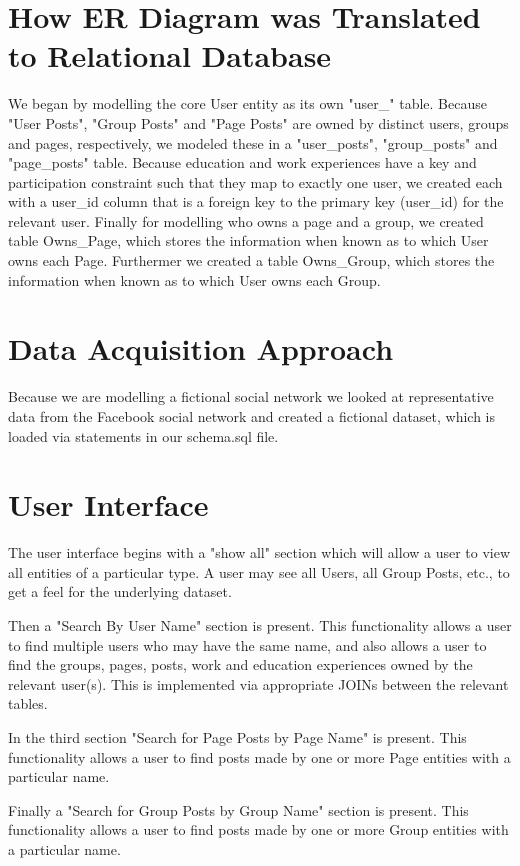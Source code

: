 \documentclass{article}
\begin{document}
\section{How ER Diagram was Translated to Relational Database}

We began by modelling the core User entity as its own "user_" table. Because "User Posts", "Group Posts" and "Page Posts" are owned by distinct users, groups and pages, respectively, we modeled these in a "user_posts", "group_posts" and "page_posts" table. Because education and work experiences have a key and participation constraint such that they map to exactly one user, we created each with a user_id column that is a foreign key to the primary key (user_id) for the relevant user. Finally for modelling who owns a page and a group, we created table Owns_Page, which stores the information when known as to which User owns each Page. Furthermer we created a table Owns_Group, which stores the information when known as to which User owns each Group.

\section{Data Acquisition Approach}

Because we are modelling a fictional social network we looked at representative data from the Facebook social network and created a fictional dataset, which is loaded via statements in our schema.sql file.

\section{User Interface}

The user interface begins with a "show all" section which will allow a user to view all entities of a particular type. A user may see all Users, all Group Posts, etc., to get a feel for the underlying dataset.

Then a "Search By User Name" section is present. This functionality allows a user to find multiple users who may have the same name, and also allows a user to find the groups, pages, posts, work and education experiences owned by the relevant user(s). This is implemented via appropriate JOINs between the relevant tables.

In the third section "Search for Page Posts by Page Name" is present. This functionality allows a user to find posts made by one or more Page entities with a particular name.

Finally a "Search for Group Posts by Group Name" section is present. This functionality allows a user to find posts made by one or more Group entities with a particular name.
\end{document}
